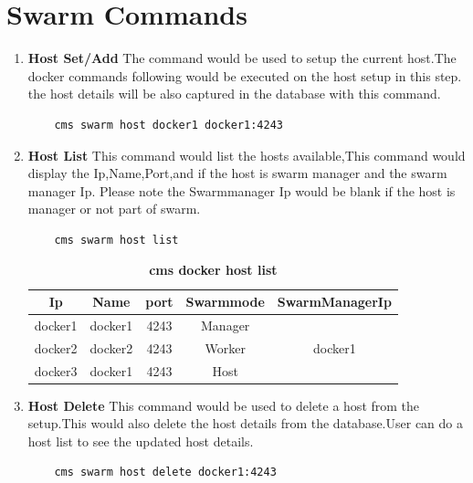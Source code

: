 \documentclass[9pt,twocolumn,twoside]{../../styles/osajnl}
\begin{document}
\section{Swarm Commands}
\begin{enumerate}
    \item \textbf{Host Set/Add}
     The command would be used to setup the current host.The docker commands following would be executed on the host setup in this step. the host details will be also captured in the database with this command.\\
     
    \begin{verbatim}
    cms swarm host docker1 docker1:4243
    \end{verbatim} 

     
    \item \textbf{Host List}
     This command would list the hosts available,This command would display the Ip,Name,Port,and if the host is swarm manager and the swarm manager Ip. Please note the Swarmmanager Ip would be blank if the host is manager or not part of swarm.
     
    \begin{verbatim}
    cms swarm host list
    \end{verbatim} 

     \begin{table}[htbp]
     \caption{\bf cms docker host list }
     \begin{tabular}{ccccc}
     \hline
      Ip & Name & port & Swarmmode &SwarmManagerIp\\
      \hline
      docker1 & docker1 & 4243 & Manager & \\
      docker2 & docker2 & 4243 & Worker & docker1\\
      docker3 & docker1 & 4243 & Host & \\
     \hline
     \end{tabular}
     \label{tab:shape-functions}
     \end{table}
     
    \item \textbf{Host Delete}
    This command would be used to delete a host from the setup.This would also delete the host details from the database.User can do a host list to see the updated host details.\\

    \begin{verbatim}
    cms swarm host delete docker1:4243
    \end{verbatim} 
    

\end{enumerate}
\end{document}
